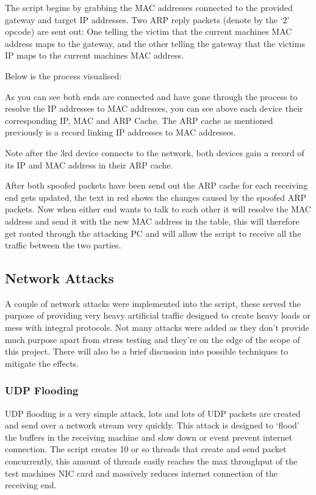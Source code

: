 The script begins by grabbing the MAC addresses connected to the provided gateway and target IP addresses. Two ARP reply packets (denote by the `2' opcode) are sent out: One telling the victim that the current machines MAC address maps to the gateway, and the other telling the gateway that the victims IP maps to the current machines MAC address.

Below is the process visualised:


As you can see both ends are connected and have gone through the process to resolve the IP addresses to MAC addresses, you can see above each device their corresponding IP, MAC and ARP Cache. The ARP cache as mentioned previously is a record linking IP addresses to MAC addresses.


Note after the 3rd device connects to the network, both devices gain a record of its IP and MAC address in their ARP cache. 

After both spoofed packets have been send out the ARP cache for each receiving end gets updated, the text in red shows the changes caused by the spoofed ARP packets. Now when either end wants to talk to each other it will resolve the MAC address and send it with the new MAC address in the table, this will therefore get routed through the attacking PC and will allow the script to receive all the traffic between the two parties.

\subsection{Network Attacks}
A couple of network attacks were implemented into the script, these served the purpose of providing very heavy artificial traffic designed to create heavy loads or mess with integral protocols. Not many attacks were added as they don't provide much purpose apart from stress testing and they're on the edge of the scope of this project. There will also be a brief discussion into possible techniques to mitigate the effects. 

\subsubsection{UDP Flooding}
UDP flooding is a very simple attack, lots and lots of UDP packets are created and send over a network stream very quickly. This attack is designed to `flood' the buffers in the receiving machine and slow down or event prevent internet connection. The script creates 10 or so threads that create and send packet concurrently, this amount of threads easily reaches the max throughput of the test machines NIC card and massively reduces internet connection of the receiving end.

